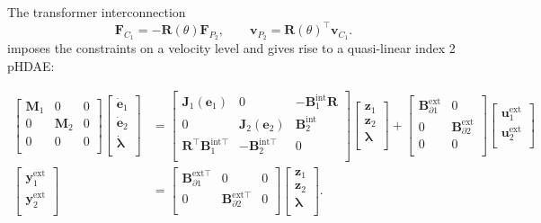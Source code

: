 \documentclass{svjour3}                     %
\begin{document}
The transformer interconnection
\begin{equation}
\label{eq:int_hinge}
\bm{F}_{C_1} = -\bm{R}(\theta) \bm{F}_{P_2}, \qquad
\bm{v}_{P_2} = \bm{R}(\theta)^\top \bm{v}_{C_1}.
\end{equation}
imposes the constraints on a velocity level and gives rise to a quasi-linear index 2 pHDAE:

\begin{equation}
\label{eq:int_beams}
\begin{aligned}
\begin{bmatrix}
\bm{M}_1 & 0 & 0 \\ 
0 & \bm{M}_2 & 0 \\
0 & 0 & 0 \\
\end{bmatrix}
\begin{bmatrix}
\dot{\bm{e}}_1 \\ \dot{\bm{e}}_2 \\ \dot{\bm{\lambda}} \\
\end{bmatrix} &= 
\begin{bmatrix}
\bm{J}_1(\bm{e}_1) & 0 & -\bm{B}_1^{\text{int}} \bm{R} \\ 
0 & \bm{J}_2(\bm{e}_2) & \bm{B}_2^{\text{int}} \\
\bm{R}^\top \bm{B}_1^{\text{int} \top} & - \bm{B}_2^{\text{int} \top} & 0 \\
\end{bmatrix}
\begin{bmatrix}
\bm{z}_1  \\ 
\bm{z}_2  \\ 
\bm{\lambda} \\
\end{bmatrix}+ 
\begin{bmatrix}
\bm{B}_{\partial 1}^{\text{ext}} & 0 \\ 0 & \bm{B}_{\partial 2}^{\text{ext}} \\ 0 & 0 \\
\end{bmatrix} 
\begin{bmatrix}
\bm{u}_1^{\text{ext}} \\ 
\bm{u}_2^{\text{ext}} \\
\end{bmatrix} \\
\begin{bmatrix}
\bm{y}_1^{\text{ext}} \\ \bm{y}_2^{\text{ext}} \\
\end{bmatrix}  &= \begin{bmatrix}
\bm{B}_{\partial 1}^{\text{ext} \top} & 0 & 0 \\
0 & \bm{B}_{\partial 2}^{\text{ext} \top} & 0 \\
\end{bmatrix} \begin{bmatrix}
\bm{z}_1  \\ 
\bm{z}_2  \\ 
\bm{\lambda} \\
\end{bmatrix}.
\end{aligned}
\end{equation}
\end{document}
